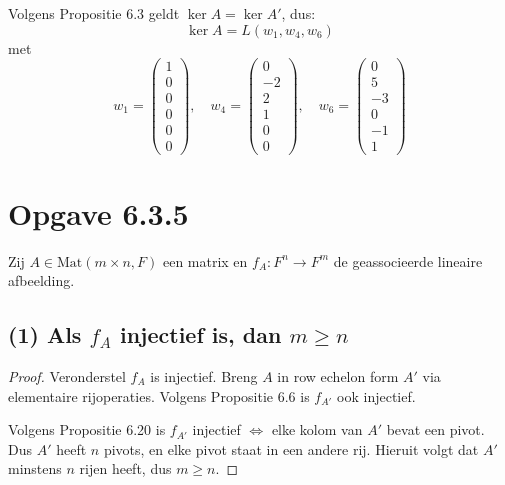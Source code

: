 \documentclass{article}
\begin{document}
Volgens Propositie 6.3 geldt $\ker A = \ker A'$, dus:
\[ \boxed{\ker A = L(w_1, w_4, w_6)} \]
met
\[ w_1 = \begin{pmatrix} 1 \\ 0 \\ 0 \\ 0 \\ 0 \\ 0 \end{pmatrix}, \quad
    w_4 = \begin{pmatrix} 0 \\ -2 \\ 2 \\ 1 \\ 0 \\ 0 \end{pmatrix}, \quad
    w_6 = \begin{pmatrix} 0 \\ 5 \\ -3 \\ 0 \\ -1 \\ 1 \end{pmatrix} \]

\section*{Opgave 6.3.5}
Zij $A \in \text{Mat}(m \times n, F)$ een matrix en $f_A : F^n \to F^m$ de geassocieerde lineaire afbeelding.

\subsection*{(1) Als $f_A$ injectief is, dan $m \geq n$}
\begin{proof}
    Veronderstel $f_A$ is injectief. Breng $A$ in row echelon form $A'$ via elementaire rijoperaties.
    Volgens Propositie 6.6 is $f_{A'}$ ook injectief.

    Volgens Propositie 6.20 is $f_{A'}$ injectief $\Leftrightarrow$ elke kolom van $A'$ bevat een pivot.
    Dus $A'$ heeft $n$ pivots, en elke pivot staat in een andere rij.
    Hieruit volgt dat $A'$ minstens $n$ rijen heeft, dus $m \geq n$.
\end{proof}
\end{document}
